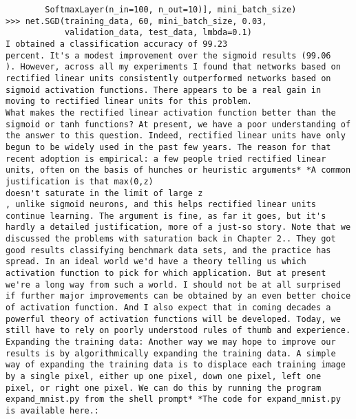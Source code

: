 \begin{lstlisting}
        SoftmaxLayer(n_in=100, n_out=10)], mini_batch_size)
>>> net.SGD(training_data, 60, mini_batch_size, 0.03, 
            validation_data, test_data, lmbda=0.1)
I obtained a classification accuracy of 99.23
percent. It's a modest improvement over the sigmoid results (99.06
). However, across all my experiments I found that networks based on rectified linear units consistently outperformed networks based on sigmoid activation functions. There appears to be a real gain in moving to rectified linear units for this problem.
What makes the rectified linear activation function better than the sigmoid or tanh functions? At present, we have a poor understanding of the answer to this question. Indeed, rectified linear units have only begun to be widely used in the past few years. The reason for that recent adoption is empirical: a few people tried rectified linear units, often on the basis of hunches or heuristic arguments* *A common justification is that max(0,z)
doesn't saturate in the limit of large z
, unlike sigmoid neurons, and this helps rectified linear units continue learning. The argument is fine, as far it goes, but it's hardly a detailed justification, more of a just-so story. Note that we discussed the problems with saturation back in Chapter 2.. They got good results classifying benchmark data sets, and the practice has spread. In an ideal world we'd have a theory telling us which activation function to pick for which application. But at present we're a long way from such a world. I should not be at all surprised if further major improvements can be obtained by an even better choice of activation function. And I also expect that in coming decades a powerful theory of activation functions will be developed. Today, we still have to rely on poorly understood rules of thumb and experience.
Expanding the training data: Another way we may hope to improve our results is by algorithmically expanding the training data. A simple way of expanding the training data is to displace each training image by a single pixel, either up one pixel, down one pixel, left one pixel, or right one pixel. We can do this by running the program expand_mnist.py from the shell prompt* *The code for expand_mnist.py is available here.:
 

\end{lstlisting}
